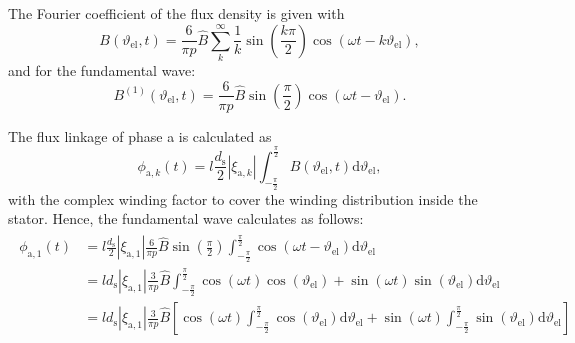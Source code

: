 \begin{solutionblock}
    The Fourier coefficient of the flux density is given with
    \begin{equation}
        B(\vartheta_{\mathrm{el}},t) = \frac{6}{\pi p} \hat{B} \sum_{k}^{\infty} \frac{1}{k} \sin\left(\frac{k\pi}{2} \right) \cos(\omega t - k \vartheta_{\mathrm{el}}),
    \end{equation}
    and for the fundamental wave:
    \begin{equation}
        B^{(1)}(\vartheta_{\mathrm{el}},t) = \frac{6}{\pi p} \hat{B} \sin\left(\frac{\pi}{2}\right) \cos(\omega t - \vartheta_{\mathrm{el}}).
    \end{equation}

    The flux linkage of phase a is calculated as
    \begin{equation}
        \phi_{\mathrm{a,}k}(t) = l \frac{d_{\mathrm{s}}}{2} |\xi_{\mathrm{a},k}| \int_{-\frac{\pi}{2}}^{\frac{\pi}{2}} B(\vartheta_{\mathrm{el}},t) \mathrm{d}\vartheta_{\mathrm{el}},
        \label{eq:phi_a_k_concentrated}
    \end{equation}
    with the complex winding factor to cover the winding distribution inside the stator.
    Hence, the fundamental wave calculates as follows:
    \begin{align}
        \begin{split}
            \phi_{\mathrm{a,}1}(t) & = l \frac{d_{\mathrm{s}}}{2} |\xi_{\mathrm{a},1}|
            \frac{6}{\pi p} \hat{B} \sin\left(\frac{\pi}{2}\right) \int_{-\frac{\pi}{2}}^{\frac{\pi}{2}} \cos(\omega t - \vartheta_{\mathrm{el}}) \mathrm{d}\vartheta_{\mathrm{el}}                                                                                    \\
                                   & = l d_{\mathrm{s}} |\xi_{\mathrm{a},1}|
            \frac{3}{\pi p} \hat{B}
            \int_{-\frac{\pi}{2}}^{\frac{\pi}{2}}\cos(\omega t) \cos(\vartheta_{\mathrm{el}}) + \sin(\omega t) \sin(\vartheta_{\mathrm{el}}) \mathrm{d}\vartheta_{\mathrm{el}}                                                                                         \\
                                   & = l d_{\mathrm{s}} |\xi_{\mathrm{a},1}|
            \frac{3}{\pi p} \hat{B}
            \left[\cos(\omega t) \int_{-\frac{\pi}{2}}^{\frac{\pi}{2}} \cos(\vartheta_{\mathrm{el}}) \mathrm{d}\vartheta_{\mathrm{el}} + \sin(\omega t) \int_{-\frac{\pi}{2}}^{\frac{\pi}{2}} \sin(\vartheta_{\mathrm{el}}) \mathrm{d} \vartheta_{\mathrm{el}} \right] \\

\end{split}
\end{align}
\end{solutionblock}
